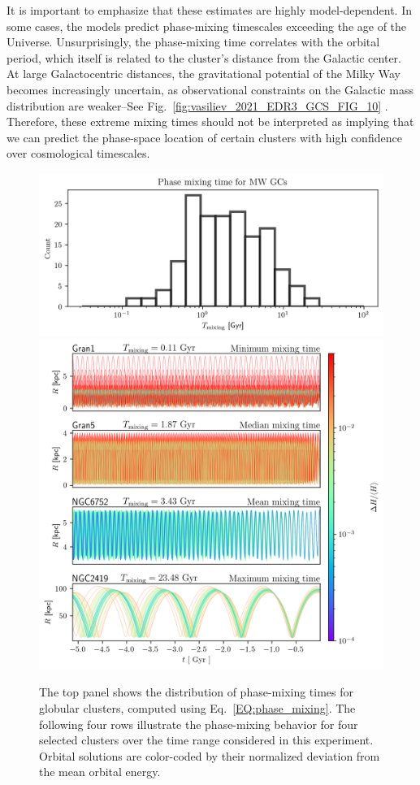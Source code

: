             It is important to emphasize that these estimates are highly model-dependent. In some cases, the models predict phase-mixing timescales exceeding the age of the Universe. Unsurprisingly, the phase-mixing time correlates with the orbital period, which itself is related to the cluster's distance from the Galactic center. At large Galactocentric distances, the gravitational potential of the Milky Way becomes increasingly uncertain, as observational constraints on the Galactic mass distribution are weaker--See Fig.~\ref{fig:vasiliev_2021_EDR3_GCS_FIG_10} \citep{2021MNRAS.505.5978V}. Therefore, these extreme mixing times should not be interpreted as implying that we can predict the phase-space location of certain clusters with high confidence over cosmological timescales. 
            \begin{figure}
                \centering
                \includegraphics[width=.75\linewidth]{images/phase_mixing_time_histogram_MWGCS.png}
                \includegraphics[width=\linewidth]{images/phase_mixing_orbital_errors_sample.png}
                \caption{The top panel shows the distribution of phase-mixing times for globular clusters, computed using Eq.~\ref{EQ:phase_mixing}. The following four rows illustrate the phase-mixing behavior for four selected clusters over the time range considered in this experiment. Orbital solutions are color-coded by their normalized deviation from the mean orbital energy.}
                \label{fig:phase_mixing_orbital_errors_sample}
            \end{figure}
